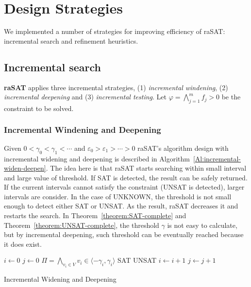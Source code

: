 \chapter{Design Strategies}
We implemented a number of strategies for improving efficiency of raSAT: incremental search and refinement heuristics.
\section{Incremental search} \label{sec:incsearch}
{\bf raSAT} applies three incremental strategies, 
(1) {\em incremental windening}, (2) {\em incremental deepening} and (3) {\em incremental testing}. 
Let
$\varphi = \bigwedge \limits_{j=1}^m f_j > 0$ be the constraint to be solved.

\subsection{Incremental Windening and Deepening}
Given $0 < \gamma_0 < \gamma_1 < \cdots$ and $\varepsilon_0 > \varepsilon_1 > \cdots > 0$ raSAT's algorithm design with incremental widening and deepening is described in Algorithm~\ref{Al:incremental-widen-deepen}. The idea here is that raSAT starts searching within small interval and large value of threshold. If SAT is detected, the result can be safely returned. If the current intervals cannot satisfy the constraint (UNSAT is detected), larger intervals are consider. In the case of UNKNOWN, the threshold is not small enough to detect either SAT or UNSAT. As the result, raSAT decreases it and restarts the search. In Theorem~\ref{theorem:SAT-complete} and Theorem~\ref{theorem:UNSAT-complete}, the threshold $\gamma$ is not easy to calculate, but by incremental deepening, such threshold can be eventually reached because it does exist.
\begin{algorithm}
\begin{algorithmic}[1]
\State $i\gets 0$
\State $j\gets 0$
	\State $\Pi = \bigwedge\limits_{v_i \in V} v_i \in \langle -\gamma_i, \gamma_i \rangle$ 
		\State \Return SAT
			\State \Return UNSAT
		\Else 
			\State $i \gets i + 1$
		\EndIf
	\Else 
		\State $j \gets j + 1$
	\EndIf
\EndWhile
\end{algorithmic}
\caption{Incremental Widening and Deepening}
\label{Al:incremental-widen-deepen}
\end{algorithm}
